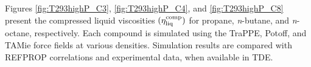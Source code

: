 \documentclass[preprint,review,12pt]{elsarticle}
\begin{document}
	Figures \ref{fig:T293highP_C3}, \ref{fig:T293highP_C4}, and \ref{fig:T293highP_C8} present the compressed liquid viscosities $(\eta_{\rm liq}^{\rm comp})$ for propane, \textit{n}-butane, and \textit{n}-octane, respectively. Each compound is simulated using the TraPPE, Potoff, and TAMie force fields at various densities. Simulation results are compared with REFPROP correlations and experimental data, when available in TDE. 
	
	
	
	

	
\end{document}
